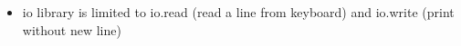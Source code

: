 \begin{itemize}
\item io library is limited to io.read (read a line from keyboard) and io.write (print without new line)
\end{itemize}